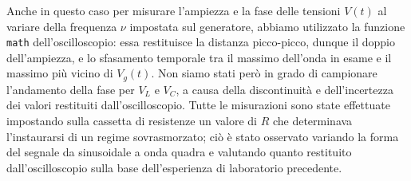 \documentclass[a4paper]{article}
\begin{document}
Anche in questo caso per misurare l'ampiezza e la fase delle tensioni $V(t)$ al variare della frequenza $\nu$ impostata sul generatore, abbiamo utilizzato la funzione \texttt{math} dell'oscilloscopio: essa restituisce la distanza picco-picco, dunque il doppio dell'ampiezza, e lo sfasamento temporale tra il massimo dell'onda in esame e il massimo più vicino di $V_g(t)$. Non siamo stati però in grado di campionare l'andamento della fase per $V_L$ e $V_C$, a causa della discontinuità e dell'incertezza dei valori restituiti dall'oscilloscopio. 
Tutte le misurazioni sono state effettuate impostando sulla cassetta di resistenze un valore di $R$ che determinava l'instaurarsi di un regime sovrasmorzato; ciò è stato osservato variando la forma del segnale da sinusoidale a onda quadra e valutando quanto restituito dall'oscilloscopio sulla base dell'esperienza di laboratorio precedente.
\end{document}
